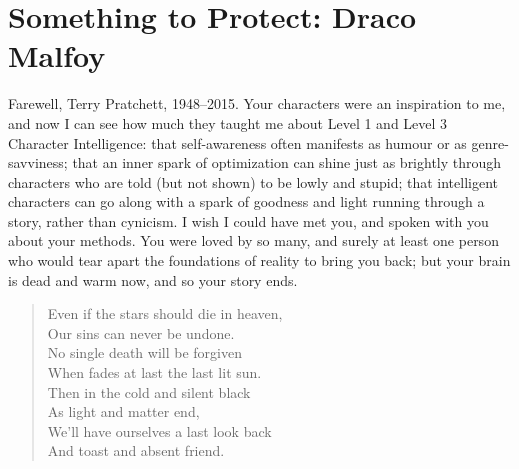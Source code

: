 \chapter[Something to Protect: Draco Malfoy]{Something to Protect: Draco Malfoy\protect\footnotemark}

\begin{chapterOpeningAuthorNote}
Farewell, Terry Pratchett, 1948–2015. Your characters were an inspiration to me, and now I can see how much they taught me about Level 1 and Level 3 Character Intelligence: that self-awareness often manifests as humour or as genre-savviness; that an inner spark of optimization can shine just as brightly through characters who are told (but not shown) to be lowly and stupid; that intelligent characters can go along with a spark of goodness and light running through a story, rather than cynicism. I wish I could have met you, and spoken with you about your methods. You were loved by so many, and surely at least one person who would tear apart the foundations of reality to bring you back; but your brain is dead and warm now, and so your story ends.
\begin{verse}
Even if the stars should die in heaven, \\
Our sins can never be undone. \\
No single death will be forgiven \\
When fades at last the last lit sun. \\
Then in the cold and silent black \\
As light and matter end, \\
We’ll have ourselves a last look back \\
And toast and absent friend. \\
\end{verse}
~
\end{chapterOpeningAuthorNote}


